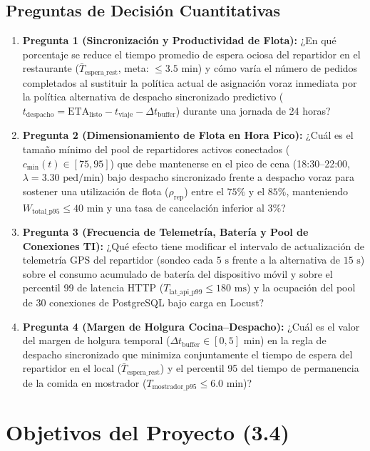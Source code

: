 \documentclass[11pt,letterpaper]{article}
\begin{document}
\subsection{Preguntas de Decisión Cuantitativas}
\begin{enumerate}[leftmargin=1.5em, itemsep=0.4em]
    \item \textbf{Pregunta 1 (Sincronización y Productividad de Flota):} ¿En qué porcentaje se reduce el tiempo promedio de espera ociosa del repartidor en el restaurante ($\bar{T}_{\text{espera\_rest}}$, meta: $\le 3.5\text{ min}$) y cómo varía el número de pedidos completados al sustituir la política actual de asignación voraz inmediata por la política alternativa de despacho sincronizado predictivo ($t_{\text{despacho}} = \text{ETA}_{\text{listo}} - t_{\text{viaje}} - \Delta t_{\text{buffer}}$) durante una jornada de 24 horas?
    \item \textbf{Pregunta 2 (Dimensionamiento de Flota en Hora Pico):} ¿Cuál es el tamaño mínimo del pool de repartidores activos conectados ($c_{\min}(t) \in [75, 95]$) que debe mantenerse en el pico de cena (18:30–22:00, $\lambda = 3.30\text{ ped/min}$) bajo despacho sincronizado frente a despacho voraz para sostener una utilización de flota ($\rho_{\text{rep}}$) entre el $75\%$ y el $85\%$, manteniendo $W_{\text{total\_p95}} \le 40\text{ min}$ y una tasa de cancelación inferior al $3\%$?
    \item \textbf{Pregunta 3 (Frecuencia de Telemetría, Batería y Pool de Conexiones TI):} ¿Qué efecto tiene modificar el intervalo de actualización de telemetría GPS del repartidor (sondeo cada $5\text{ s}$ frente a la alternativa de $15\text{ s}$) sobre el consumo acumulado de batería del dispositivo móvil y sobre el percentil 99 de latencia HTTP ($T_{\text{lat\_api\_p99}} \le 180\text{ ms}$) y la ocupación del pool de 30 conexiones de PostgreSQL bajo carga en Locust?
    \item \textbf{Pregunta 4 (Margen de Holgura Cocina–Despacho):} ¿Cuál es el valor del margen de holgura temporal ($\Delta t_{\text{buffer}} \in [0, 5]\text{ min}$) en la regla de despacho sincronizado que minimiza conjuntamente el tiempo de espera del repartidor en el local ($\bar{T}_{\text{espera\_rest}}$) y el percentil 95 del tiempo de permanencia de la comida en mostrador ($T_{\text{mostrador\_p95}} \le 6.0\text{ min}$)?
\end{enumerate}

\section{Objetivos del Proyecto (3.4)}
\end{document}
